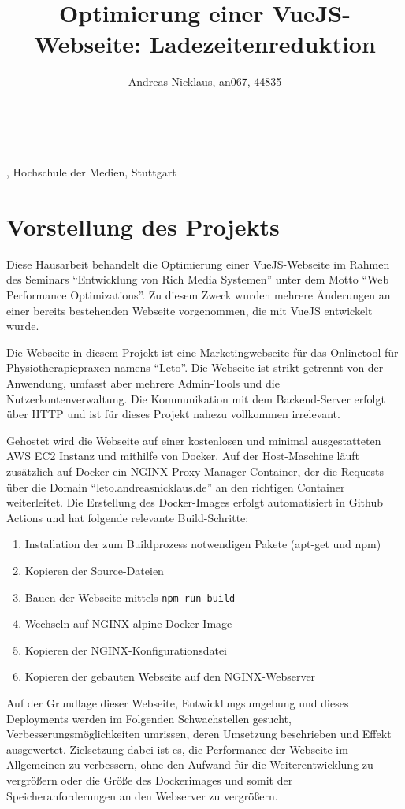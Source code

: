 \documentclass[11pt,a4paper]{article}
\title{Optimierung einer VueJS-Webseite: Ladezeitenreduktion}
\author{Andreas Nicklaus, an067, 44835}
\makeatletter
\renewcommand\maketitle{
{\raggedright %
\begin{center}
{\Huge \bfseries \sffamily \@title }\\[2ex] 
\@author\\[1ex] 
\@date, Hochschule der Medien, Stuttgart\\[1ex]
\end{center}}} %
\makeatother
\begin{document}
\maketitle

\tableofcontents

\section{Vorstellung des Projekts}
Diese Hausarbeit behandelt die Optimierung einer VueJS-Webseite im Rahmen des Seminars \enquote{Entwicklung von Rich Media Systemen} unter dem Motto \enquote{Web Performance Optimizations}.
Zu diesem Zweck wurden mehrere Änderungen an einer bereits bestehenden Webseite vorgenommen, die mit VueJS entwickelt wurde.

Die Webseite in diesem Projekt ist eine Marketingwebseite für das Onlinetool für Physiotherapiepraxen namens \enquote{Leto}.
Die Webseite ist strikt getrennt von der Anwendung, umfasst aber mehrere Admin-Tools und die Nutzerkontenverwaltung.
Die Kommunikation mit dem Backend-Server erfolgt über HTTP und ist für dieses Projekt nahezu vollkommen irrelevant.

Gehostet wird die Webseite auf einer kostenlosen und minimal ausgestatteten AWS EC2 Instanz und mithilfe von Docker.
Auf der Host-Maschine läuft zusätzlich auf Docker ein NGINX-Proxy-Manager Container, der die Requests über die Domain \enquote{leto.andreasnicklaus.de} an den richtigen Container weiterleitet.
Die Erstellung des Docker-Images erfolgt automatisiert in Github Actions und hat folgende relevante Build-Schritte:

\begin{enumerate}
  \item Installation der zum Buildprozess notwendigen Pakete (apt-get und npm)
  \item Kopieren der Source-Dateien
  \item Bauen der Webseite mittels \verb|npm run build|
  \item Wechseln auf NGINX-alpine Docker Image
  \item Kopieren der NGINX-Konfigurationsdatei
  \item Kopieren der gebauten Webseite auf den NGINX-Webserver
\end{enumerate}

Auf der Grundlage dieser Webseite, Entwicklungsumgebung und dieses Deployments werden im Folgenden Schwachstellen gesucht, Verbesserungsmöglichkeiten umrissen, deren Umsetzung beschrieben und Effekt ausgewertet.
Zielsetzung dabei ist es, die Performance der Webseite im Allgemeinen zu verbessern, ohne den Aufwand für die Weiterentwicklung zu vergrößern oder die Größe des Dockerimages und somit der Speicheranforderungen an den Webserver zu vergrößern.
\end{document}
